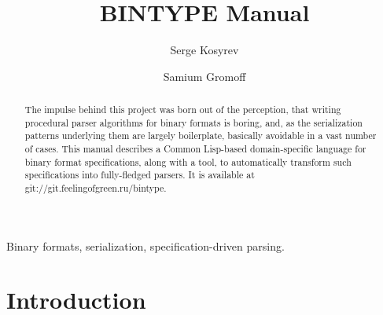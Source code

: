 \documentclass[%
	final,
	titlepage,
	anonymous,
	]{ieee}
\begin{document}
\title[BINTYPE Manual]{%
       BINTYPE Manual}

\author[KOSYREV\'{A}R]{Serge Kosyrev%
}
\author[GROMOFF\'{A}R]{Samium Gromoff%
}



\maketitle               

\begin{abstract} 
The impulse behind this project was born out of the perception,
that writing procedural parser algorithms for binary formats
is boring, and, as the serialization patterns underlying them are
largely boilerplate, basically avoidable in a vast number of cases.
This manual describes a Common Lisp-based domain-specific language for binary
format specifications, along with a tool, to automatically transform such
specifications into fully-fledged parsers.
It is available at \mbox{git://git.feelingofgreen.ru/bintype}.
\end{abstract}

\begin{keywords}
Binary formats, serialization, specification-driven parsing.
\end{keywords}

\section{Introduction}
\end{document}
